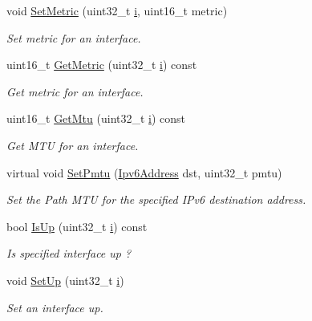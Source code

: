 \begin{DoxyCompactItemize}
void \hyperlink{classns3_1_1Ipv6L3Protocol_a5d0a141d4b667d8f39f903b9d3fbeffd}{Set\+Metric} (uint32\+\_\+t \hyperlink{lte__uplink__power__control_8m_a6f6ccfcf58b31cb6412107d9d5281426}{i}, uint16\+\_\+t metric)
\begin{DoxyCompactList}\small\item\em Set metric for an interface. \end{DoxyCompactList}\item 
uint16\+\_\+t \hyperlink{classns3_1_1Ipv6L3Protocol_ad8b41a67f3f99823d6d5e0a5441970de}{Get\+Metric} (uint32\+\_\+t \hyperlink{lte__uplink__power__control_8m_a6f6ccfcf58b31cb6412107d9d5281426}{i}) const 
\begin{DoxyCompactList}\small\item\em Get metric for an interface. \end{DoxyCompactList}\item 
uint16\+\_\+t \hyperlink{classns3_1_1Ipv6L3Protocol_a33cfa3ccae2ee968d581fc689c73beb5}{Get\+Mtu} (uint32\+\_\+t \hyperlink{lte__uplink__power__control_8m_a6f6ccfcf58b31cb6412107d9d5281426}{i}) const 
\begin{DoxyCompactList}\small\item\em Get M\+TU for an interface. \end{DoxyCompactList}\item 
virtual void \hyperlink{classns3_1_1Ipv6L3Protocol_ab99ee90351fb7bbe9d2582376c3597ae}{Set\+Pmtu} (\hyperlink{classns3_1_1Ipv6Address}{Ipv6\+Address} dst, uint32\+\_\+t pmtu)
\begin{DoxyCompactList}\small\item\em Set the Path M\+TU for the specified I\+Pv6 destination address. \end{DoxyCompactList}\item 
bool \hyperlink{classns3_1_1Ipv6L3Protocol_a34fb6e5caedebf7c257bb4fa7c125a3c}{Is\+Up} (uint32\+\_\+t \hyperlink{lte__uplink__power__control_8m_a6f6ccfcf58b31cb6412107d9d5281426}{i}) const 
\begin{DoxyCompactList}\small\item\em Is specified interface up ? \end{DoxyCompactList}\item 
void \hyperlink{classns3_1_1Ipv6L3Protocol_a834eba3100efc8f71e5292bbfdcde6e6}{Set\+Up} (uint32\+\_\+t \hyperlink{lte__uplink__power__control_8m_a6f6ccfcf58b31cb6412107d9d5281426}{i})
\begin{DoxyCompactList}\small\item\em Set an interface up. \end{DoxyCompactList}\item 

\end{DoxyCompactItemize}
